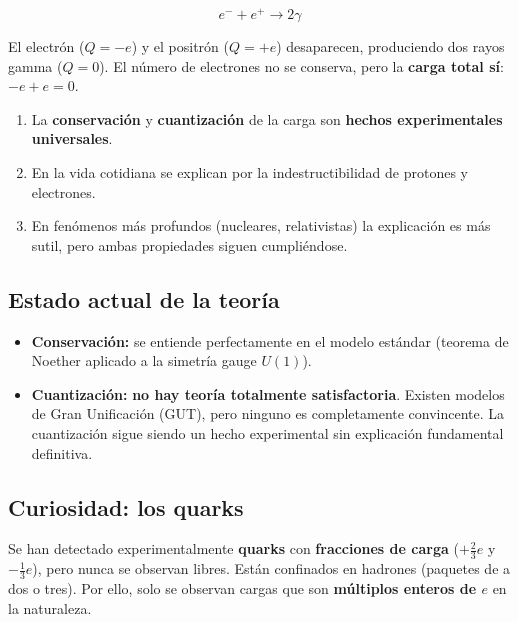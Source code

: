 \documentclass[12pt,a4paper]{article}
\begin{document}
\[
e^{-} + e^{+} \longrightarrow 2\gamma
\]

El electrón ($Q = -e$) y el positrón ($Q = +e$) desaparecen, produciendo
dos rayos gamma ($Q = 0$). El número de electrones no se conserva, pero
la \textbf{carga total sí}: $-e + e = 0$.

\begin{keybox}
  \begin{enumerate}[nosep]
    \item La \textbf{conservación} y \textbf{cuantización} de la carga
          son \textbf{hechos experimentales universales}.
    \item En la vida cotidiana se explican por la indestructibilidad de
          protones y electrones.
    \item En fenómenos más profundos (nucleares, relativistas) la
          explicación es más sutil, pero ambas propiedades siguen
          cumpliéndose.
  \end{enumerate}
\end{keybox}

\subsection{Estado actual de la teoría}

\begin{itemize}[nosep]
  \item \textbf{Conservación:} se entiende perfectamente en el modelo
        estándar (teorema de Noether aplicado a la simetría gauge
        $U(1)$).
  \item \textbf{Cuantización:} \textbf{no hay teoría totalmente
        satisfactoria}. Existen modelos de Gran Unificación (GUT),
        pero ninguno es completamente convincente. La cuantización
        sigue siendo un hecho experimental sin explicación fundamental
        definitiva.
\end{itemize}

\subsection{Curiosidad: los quarks}

Se han detectado experimentalmente \textbf{quarks} con
\textbf{fracciones de carga} ($+\frac{2}{3}e$ y $-\frac{1}{3}e$), pero
nunca se observan libres. Están confinados en hadrones (paquetes de a
dos o tres). Por ello, solo se observan cargas que son
\textbf{múltiplos enteros de $e$} en la naturaleza.
\end{document}
